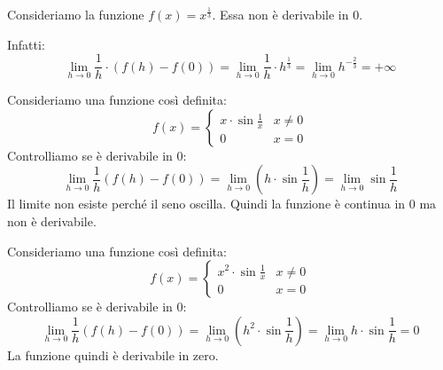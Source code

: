 \begin{example}
Consideriamo la funzione $f(x) = x^{\frac{1}{3}}$. Essa non è derivabile in 0.

\begin{center}
\end{center}

Infatti:
\begin{equation*}
\lim_{h \to 0} \frac{1}{h} \cdot (f(h)-f(0)) = \lim_{h \to 0} \frac{1}{h} \cdot h^{\frac{1}{3}} = \lim_{h \to 0} h^{-\frac{2}{3}} = +\infty
\end{equation*}
\end{example}

\begin{example}
Consideriamo una funzione così definita:
\begin{equation*}
f(x) = \begin{cases}
x \cdot \sin \frac{1}{x} & x \neq 0 \\
0 & x = 0
\end{cases}
\end{equation*}
Controlliamo se è derivabile in 0:
\begin{equation*}
\lim_{h \to 0} \frac{1}{h} (f(h)-f(0)) = \lim_{h \to 0} \left(h \cdot \sin \frac{1}{h} \right) = \lim_{h \to 0} \sin \frac{1}{h}
\end{equation*}
Il limite non esiste perché il seno oscilla. Quindi la funzione è continua in 0 ma non è derivabile.
\end{example}

\begin{example}
Consideriamo una funzione così definita:
\begin{equation*}
f(x) = \begin{cases}
x^2 \cdot \sin \frac{1}{x} & x \neq 0 \\
0 & x = 0
\end{cases}
\end{equation*}
Controlliamo se è derivabile in 0:
\begin{equation*}
\lim_{h \to 0} \frac{1}{h} (f(h)-f(0)) = \lim_{h \to 0} \left(h^2 \cdot \sin \frac{1}{h} \right) = \lim_{h \to 0} h \cdot \sin \frac{1}{h} = 0
\end{equation*}
La funzione quindi è derivabile in zero.
\end{example}

